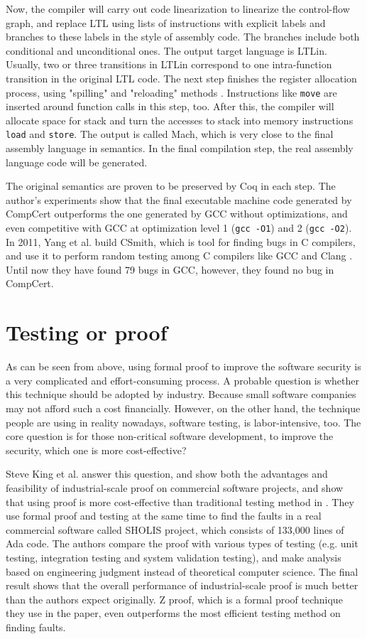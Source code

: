 \documentclass[10pt, conference, compsocconf]{IEEEtran}
\begin{document}
Now, the compiler will carry out code linearization to linearize the control-flow graph, and replace LTL using lists of instructions with explicit labels and branches to these labels in the style of assembly code. The branches include both conditional and unconditional ones. The output target language is LTLin. Usually, two or three transitions in LTLin correspond to one intra-function transition in the original LTL code. The next step finishes the register allocation process, using "spilling" and "reloading" methods \cite{compiler}. Instructions like \texttt{move} are inserted around function calls in this step, too. After this, the compiler will allocate space for stack and turn the accesses to stack into memory instructions \texttt{load} and \texttt{store}. The output is called Mach, which is very close to the final assembly language in semantics. In the final compilation step, the real assembly language code will be generated.

The original semantics are proven to be preserved by Coq in each step. The author's experiments show that the final executable machine code generated by CompCert outperforms the one generated by GCC without optimizations, and even competitive with GCC at optimization level 1 (\texttt{gcc -O1}) and 2 (\texttt{gcc -O2}). In 2011, Yang et al. build CSmith, which is tool for finding bugs in C compilers, and use it to perform random testing among C compilers like GCC and Clang \cite{CSmith}. Until now they have found 79 bugs in GCC, however, they found no bug in CompCert.

\section{Testing or proof}

As can be seen from above, using formal proof to improve the software security is a very complicated and effort-consuming process. A probable question is whether this technique should be adopted by industry. Because small software companies may not afford such a cost financially. However, on the other hand, the technique people are using in reality nowadays, software testing, is labor-intensive, too. The core question is for those non-critical software development, to improve the security, which one is more cost-effective?

Steve King et al. answer this question, and show both the advantages and feasibility of industrial-scale proof on commercial software projects, and show that using proof is more cost-effective than traditional testing method in \cite{testing}. They use formal proof and testing at the same time to find the faults in a real commercial software called SHOLIS project, which consists of 133,000 lines of Ada code. The authors compare the proof with various types of testing (e.g. unit testing, integration testing and system validation testing), and make analysis based on engineering judgment instead of theoretical computer science. The final result shows that the overall performance of industrial-scale proof is much better than the authors expect originally. Z proof, which is a formal proof technique they use in the paper, even outperforms the most efficient testing method on finding faults.
\end{document}

